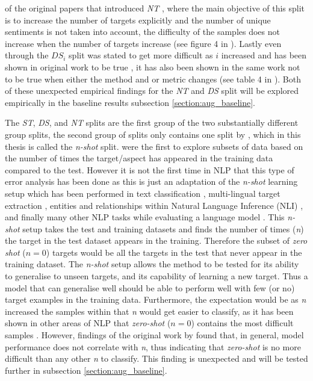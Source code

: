 of the original papers that introduced \textit{NT} \citep{zhang-etal-2019-aspect}, where the main objective of this split is to increase the number of targets explicitly and the number of unique sentiments is not taken into account, the difficulty of the samples does not increase when the number of targets increase (see figure 4 in \citet{zhang-etal-2019-aspect}).  Lastly even through the $DS_i$ split was stated to get more difficult as $i$ increased and has been shown in original work to be true \citep{wang-etal-2017-tdparse}, it has also been shown in the same work not to be true when either the method and or metric changes (see table 4 in \citet{wang-etal-2017-tdparse}). Both of these unexpected empirical findings for the \textit{NT} and \textit{DS} split will be explored empirically in the baseline results subsection \ref{section:aug_baseline}.

The \textit{ST}, \textit{DS}, and \textit{NT} splits are the first group of the two substantially different group splits, the second group of splits only contains one split by \citet{yang2018multi}, which in this thesis is called the \textit{n-shot} split. \citet{yang2018multi} were the first to explore subsets of data based on the number of times the target/aspect has appeared in the training data compared to the test. However it is not the first time in NLP that this type of error analysis has been done as this is just an adaptation of the \textit{n-shot} learning setup which has been performed in text classification \citep{zhang-etal-2019-aspect}, multi-lingual target extraction \citep{jebbara-cimiano-2019-zero}, entities and relationships within Natural Language Inference (NLI) \citep{levy-etal-2017-zero}, and finally many other NLP tasks while evaluating a language model \citep{radford2019language}. This \textit{n-shot} setup takes the test and training datasets and finds the number of times (\textit{n}) the target in the test dataset appears in the training. Therefore the subset of \textit{zero shot} ($n=0$) targets would be all the targets in the test that never appear in the training dataset. The \textit{n-shot} setup allows the method to be tested for its ability to generalise to unseen targets, and its capability of learning a new target. Thus a model that can generalise well should be able to perform well with few (or no) target examples in the training data. Furthermore, the expectation would be as \textit{n} increased the samples within that \textit{n} would get easier to classify, as it has been shown in other areas of NLP that \textit{zero-shot} ($n=0$) contains the most difficult samples \citep{jebbara-cimiano-2019-zero}. However, findings of the original work by \citet{yang2018multi} found that, in general, model performance does not correlate with \textit{n}, thus indicating that \textit{zero-shot} is no more difficult than any other \textit{n} to classify. This finding is unexpected and will be tested further in subsection \ref{section:aug_baseline}.

